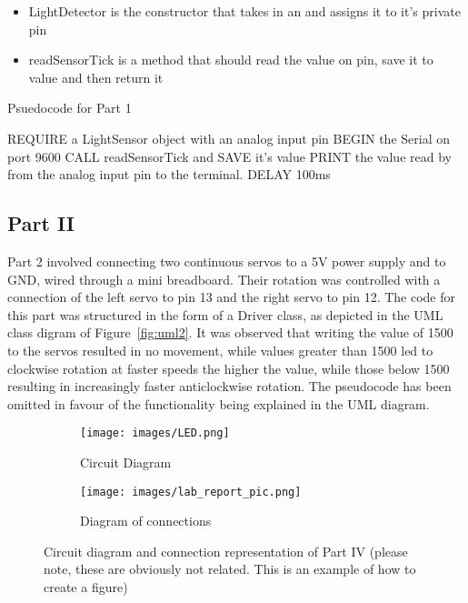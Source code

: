 \documentclass[journal]{IEEEtran}
\begin{document}
\begin{itemize}
    \item {LightDetector is the constructor that takes in an and assigns it to it's private pin}
    \item {readSensorTick is a method that should read the value on pin, save it to value and then return it}
\end{itemize}

\begin{algorithm}
\caption{Psuedocode for Part 1}\label{alg:part1}
\begin{algorithmic}[1]
\State REQUIRE a LightSensor object with an analog input pin
\State BEGIN the Serial on port 9600
\State CALL readSensorTick and SAVE it's value
\State PRINT the value read by from the analog input pin to the terminal.
\State DELAY 100ms
\EndWhile
\end{algorithmic}
\end{algorithm}

\newpage
\subsection{Part II}\label{Part2Subsection}
Part 2 involved connecting two continuous servos to a 5V power supply and to GND, wired through a mini breadboard. Their rotation was controlled with a connection of the left servo to pin 13 and the right servo to pin 12. The code for this part was structured in the form of a Driver class, as depicted in the UML class digram of Figure~\ref{fig:uml2}. It was observed that writing the value of 1500 to the servos resulted in no movement, while values greater than 1500 led to clockwise rotation at faster speeds the higher the value, while those below 1500 resulting in increasingly faster anticlockwise rotation. The pseudocode has been omitted in favour of the functionality being explained in the UML diagram.

\begin{figure}[ht]
    \centering
      \begin{subfigure}[b]{0.2\textwidth}
         \centering
         \texttt{[image: images/LED.png]} 
         \caption{Circuit Diagram}
         \label{fig:Circuit_diagram2}
     \end{subfigure}
     \begin{subfigure}[b]{0.2\textwidth}
         \centering
         \texttt{[image: images/lab\_report\_pic.png]} 
         \caption{Diagram of connections}
         \label{fig:connections2}
     \end{subfigure}  \hfill
    \caption{Circuit diagram and connection representation of Part IV (please note, these are obviously not related. This is an example of how to create a figure)}
    \label{fig:part2}
\end{figure}
\end{document}
